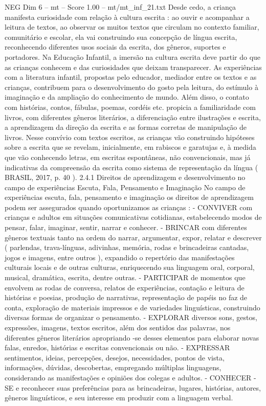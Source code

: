 \begin{textsample}{NEG Dim 6 – mt – Score 1.00 – mt/mt\_inf\_21.txt}
Desde cedo, a criança manifesta curiosidade com relação à cultura escrita : ao ouvir e acompanhar a leitura de textos, ao observar os muitos textos que circulam no contexto familiar, comunitário e escolar, ela vai construindo sua concepção de língua escrita, reconhecendo diferentes usos sociais da escrita, dos gêneros, suportes e portadores.
Na Educação Infantil, a imersão na cultura escrita deve partir do que as crianças conhecem e das curiosidades que deixam transparecer.
As experiências com a literatura infantil, propostas pelo educador, mediador entre os textos e as crianças, contribuem para o desenvolvimento do gosto pela leitura, do estímulo à imaginação e da ampliação do conhecimento de mundo.
Além disso, o contato com histórias, contos, fábulas, poemas, cordéis etc. propicia a familiaridade com livros, com diferentes gêneros literários, a diferenciação entre ilustrações e escrita, a aprendizagem da direção da escrita e as formas corretas de manipulação de livros.
Nesse convívio com textos escritos, as crianças vão construindo hipóteses sobre a escrita que se revelam, inicialmente, em rabiscos e garatujas e, à medida que vão conhecendo letras, em escritas espontâneas, não convencionais, mas já indicativas da compreensão da escrita como sistema de representação da língua ( BRASIL, 2017, p. 40 ). 2.4.1 Direitos de aprendizagem e desenvolvimento no campo de experiências Escuta, Fala, Pensamento e Imaginação No campo de experiências escuta, fala, pensamento e imaginação os direitos de aprendizagem podem ser assegurados quando oportunizamos as crianças : - CONVIVER com crianças e adultos em situações comunicativas cotidianas, estabelecendo modos de pensar, falar, imaginar, sentir, narrar e conhecer. - BRINCAR com diferentes gêneros textuais tanto na ordem do narrar, argumentar, expor, relatar e descrever ( parlendas, trava-línguas, adivinhas, memória, rodas e brincadeiras cantadas, jogos e imagens, entre outros ), expandido o repertório das manifestações culturais locais e de outras culturas, enriquecendo sua linguagem oral, corporal, musical, dramática, escrita, dentre outras. - PARTICIPAR de momentos que envolvem as rodas de conversa, relatos de experiências, contação e leitura de histórias e poesias, produção de narrativas, representação de papéis no faz de conta, exploração de materiais impressos e de variedades linguísticas, construindo diversas formas de organizar o pensamento. - EXPLORAR diversos sons, gestos, expressões, imagens, textos escritos, além dos sentidos das palavras, nos diferentes gêneros literários apropriando -se desses elementos para elaborar novas falas, enredos, histórias e escritas convencionais ou não. - EXPRESSAR sentimentos, ideias, percepções, desejos, necessidades, pontos de vista, informações, dúvidas, descobertas, empregando múltiplas linguagens, considerando as manifestações e opiniões dos colegas e adultos. - CONHECER -SE e reconhecer suas preferências para as brincadeiras, lugares, histórias, autores, gêneros linguísticos, e seu interesse em produzir com a linguagem verbal.

\end{textsample}
